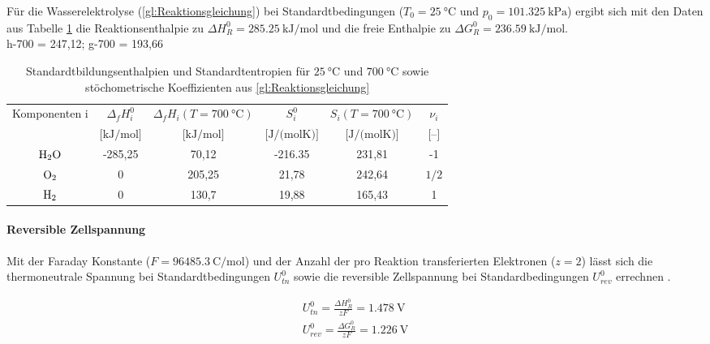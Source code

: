 Für die Wasserelektrolyse (\ref{gl:Reaktionsgleichung}) bei Standardtbedingungen ($T_0 = \SI{25}{\degreeCelsius}$ und $p_0 = \SI{101,325}{\kilo\pascal}$) ergibt sich mit den Daten aus Tabelle \ref{tb:Stoffdaten} die Reaktionsenthalpie zu $\Delta H^0_R = \SI{285,25}{\kilo\J\per\mol}$ und die freie Enthalpie zu $\Delta G^0_R = \SI{236,59}{\kilo\J\per\mol}$.\\ 
h-700 = 247,12; g-700 = 193,66
\begin{table}[ht]
		\centering
		\caption{Standardtbildungsenthalpien und Standardtentropien für $\SI{25}{\degreeCelsius}$ \citep{koj_entwicklung_2021} und $\SI{700}{\degreeCelsius}$ \citep{Informatics} sowie stöchometrische Koeffizienten aus \ref{gl:Reaktionsgleichung}}
		\begin{tabular}{c c c c c c}
		\toprule
		\multirow{2}{*}{Komponenten i} & 
		\multicolumn{1}{c}{$\Delta_f H^0_i$} & 
		\multicolumn{1}{c}{$\Delta_f H_i (T=\SI{700}{\degreeCelsius})$} &
		\multicolumn{1}{c}{$S^0_i$} &
		\multicolumn{1}{c}{$S_i (T=\SI{700}{\degreeCelsius})$} &
		\multicolumn{1}{c}{$\nu_i$}
		\\
		& 
		\multicolumn{1}{c}{$\textrm{[kJ/mol]}$}& 
		\multicolumn{1}{c}{$\textrm{[kJ/mol]}$}& 
		\multicolumn{1}{c}{$\textrm{[J/(molK)]}$} &
		\multicolumn{1}{c}{$\textrm{[J/(molK)]}$} &
		\multicolumn{1}{c}{$\textrm{[--]}$}
		\\
		\midrule
		$\ce{H2O}$ & -285,25 & 70,12 & -216.35 & 231,81 & -1\\
		$\ce{O2}$ & 0 & 205,25 & 21,78 & 242,64 & $\textrm{1/2}$\\
		$\ce{H2}$ & 0 & 130,7 & 19,88 & 165,43 & 1\\
		\bottomrule
		\end{tabular}
		\label{tb:Stoffdaten}
		\end{table}	
			
\paragraph{Reversible Zellspannung}
\label{par:rev Zellspannung}
Mit der Faraday Konstante ($F=\SI{96485,3}{\coulomb\per\mol}$) und der Anzahl der pro Reaktion transferierten Elektronen ($z = 2$) lässt sich die thermoneutrale Spannung bei Standardtbedingungen $U^0_{tn}$ sowie die reversible Zellspannung bei Standardbedingungen $U^0_{rev}$ errechnen \citep{falcao_review_2020}. 

\begin{align}
 U^0_{tn} = \frac{\Delta H^0_R}{zF} = \SI{1,478}{\volt}\\
 U^0_{rev} = \frac{\Delta G^0_R}{zF} = \SI{1,226}{\volt}
\end{align}


